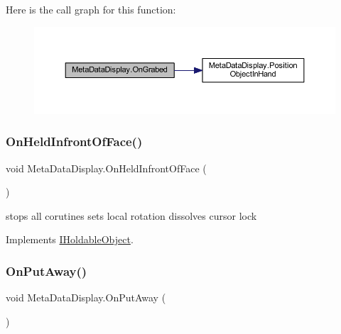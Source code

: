 Here is the call graph for this function\+:\nopagebreak
\begin{figure}[H]
\begin{center}
\leavevmode
\includegraphics[width=350pt]{class_meta_data_display_a7d639d7bc58c9340a7f5274884bbc11d_cgraph}
\end{center}
\end{figure}
\mbox{\label{class_meta_data_display_ab91c62e23ca6af27f8a30859d5a172c9}} 
\subsubsection{\texorpdfstring{On\+Held\+Infront\+Of\+Face()}{OnHeldInfrontOfFace()}}
{\footnotesize\ttfamily void Meta\+Data\+Display.\+On\+Held\+Infront\+Of\+Face (\begin{DoxyParamCaption}{ }\end{DoxyParamCaption})}



stops all corutines sets local rotation dissolves cursor lock 



Implements \mbox{\hyperlink{interface_i_holdable_object_a6f63fec8fb8f715ad5cdd08aa5ec0ea5}{I\+Holdable\+Object}}.

\mbox{\label{class_meta_data_display_a55888c6c3e3e224d89d95b6c63652762}} 
\subsubsection{\texorpdfstring{On\+Put\+Away()}{OnPutAway()}}
{\footnotesize\ttfamily void Meta\+Data\+Display.\+On\+Put\+Away (\begin{DoxyParamCaption}{ }\end{DoxyParamCaption})}



